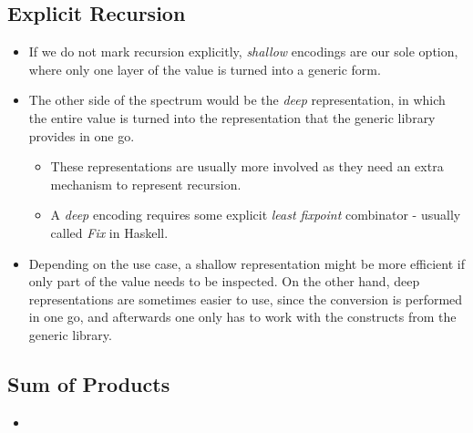 \subsection{Explicit Recursion}
\begin{itemize}
    \item If we do not mark recursion explicitly, \textit{shallow} encodings are our sole option, where only one layer of the value is turned into a generic form.
    \item The other side of the spectrum would be the \textit{deep} representation, in which the entire value is turned into the representation that the generic library provides in one go. 
    \begin{itemize}
        \item These representations are usually more involved as they need an extra mechanism to represent recursion.
        \item A \textit{deep} encoding requires some explicit \textit{least fixpoint} combinator - usually called \textit{Fix} in Haskell.
    \end{itemize}
    \item Depending on the use case, a shallow representation might be more efficient if only part of the value needs to be inspected. On the other hand, deep representations are sometimes easier to use, since the conversion is performed in one go, and afterwards one only has to work with the constructs from the generic library.
\end{itemize}

\subsection{Sum of Products}
\begin{itemize}
    \item 
\end{itemize}